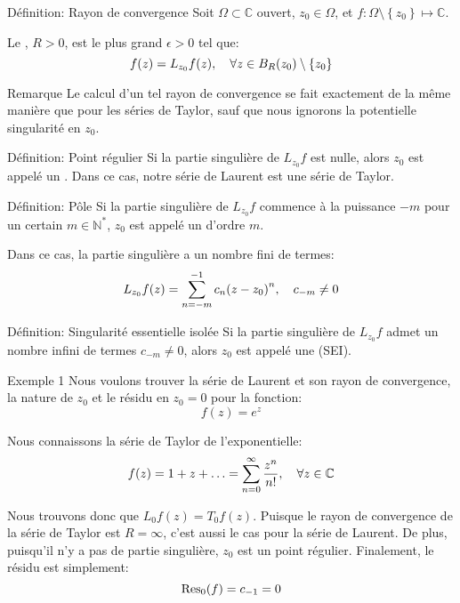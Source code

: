 \documentclass[a4paper]{article}
\begin{document}
\begin{parag}{Définition: Rayon de convergence}
    Soit $\Omega \subset \mathbb{C}$ ouvert, $z_0 \in \Omega$, et $f: \Omega \setminus \left\{z_0\right\} \mapsto \mathbb{C}$. 

    Le , $R > 0$, est le plus grand $\epsilon > 0$ tel que: 
    \[f\left(z\right) = L_{z_0} f\left(z\right), \mathspace \forall z \in B_R\left(z_0\right) \setminus \left\{z_0\right\}\]

    \begin{subparag}{Remarque}
        Le calcul d'un tel rayon de convergence se fait exactement de la même manière que pour les séries de Taylor, sauf que nous ignorons la potentielle singularité en $z_0$.
    \end{subparag}
    
\end{parag}

\begin{parag}{Définition: Point régulier}
    Si la partie singulière de $L_{z_0}f$ est nulle, alors $z_0$ est appelé un . Dans ce cas, notre série de Laurent est une série de Taylor.
\end{parag}

\begin{parag}{Définition: Pôle}
    Si la partie singulière de $L_{z_0} f$ commence à la puissance $-m$ pour un certain $m \in \mathbb{N}^*$, $z_0$ est appelé un  d'ordre $m$.

    Dans ce cas, la partie singulière a un nombre fini de termes: 
    \[L_{z_0} f\left(z\right) = \sum_{n=-m}^{-1} c_n \left(z-z_0\right)^n, \mathspace c_{-m} \neq 0\]
\end{parag}

\begin{parag}{Définition: Singularité essentielle isolée}
    Si la partie singulière de $L_{z_0}f$ admet un nombre infini de termes $c_{-m} \neq 0$, alors $z_0$ est appelé une  (SEI).
\end{parag}

\begin{parag}{Exemple 1}
    Nous voulons trouver la série de Laurent et son rayon de convergence, la nature de $z_0$ et le résidu en $z_0 = 0$ pour la fonction: 
    \[f\left(z\right) = e^z\]
    
    Nous connaissons la série de Taylor de l'exponentielle: 
    \[f\left(z\right) = 1 + z + \ldots = \sum_{n=0}^{\infty} \frac{z^n}{n!}, \mathspace \forall z \in \mathbb{C}\]
    
    Nous trouvons donc que $L_{0}f\left(z\right) = T_{0} f\left(z\right)$. Puisque le rayon de convergence de la série de Taylor est $R = \infty$, c'est aussi le cas pour la série de Laurent. De plus, puisqu'il n'y a pas de partie singulière, $z_0$ est un point régulier. Finalement, le résidu est simplement: 
    \[\Res_0\left(f\right) = c_{-1} = 0\]
\end{parag}
\end{document}
